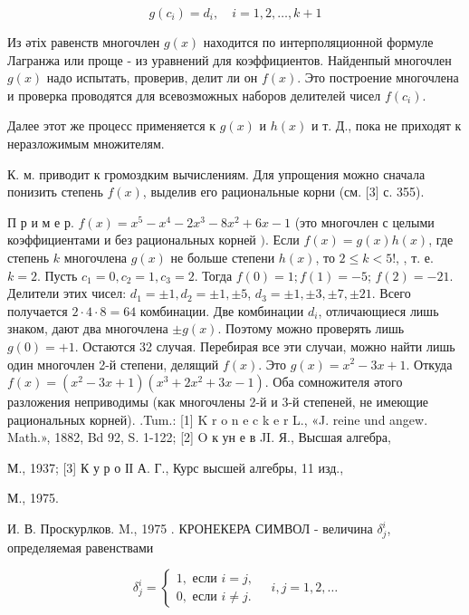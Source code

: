 \documentclass[10pt]{article}
\begin{document}
\[

g\left(c_{i}\right)=d_{i}, \quad i=1,2, \ldots, k+1

\]



Из әтіх равенств многочлен $g(x)$ находится по интерполяционной формуле Лагранжа или проще - из уравнений для коэффициентов. Найденпый многочлен $g(x)$ надо испытать, проверив, делит ли он $f(x)$. Это построение многочлена и проверка проводятся для всевозможных наборов делителей чисел $f\left(c_{i}\right)$.



Далее этот же процесс применяется к $g(x)$ и $h(x)$ и т. Д., пока не приходят к неразложимым множителям.



К. м. приводит к громоздким вычислениям. Для упрощения можно сначала понизить степень $f(x)$, выделив его рациональные корни (см. [3] с. 355).



П р и м е р. $f(x)=x^{5}-x^{4}-2 x^{3}-8 x^{2}+6 x-1$ (это многочлен с целыми коэффициентами и без рациональных корней $)$. Если $f(x)=g(x) h(x)$, где степень $k$ многочлена $g(x)$ не больше степени $h(x)$, то $2 \leqslant k<5 !$, , т. е. $k=2$. Пусть $c_{1}=0, c_{2}=1, c_{3}=2$. Тогда $f(0)=1 ; f(1)=-5$; $f(2)=-21$. Делители этих чисел: $d_{1}= \pm 1, d_{2}= \pm 1, \pm 5$, $d_{3}= \pm 1, \pm 3, \pm 7, \pm 21$. Всего получается $2 \cdot 4 \cdot 8=64$ комбинации. Две комбинации $d_{i}$, отличающиеся лишь знаком, дают два многочлена $\pm g(x)$. Поэтому можно проверять лишь $g(0)=+1$. Остаются 32 случая. Перебирая все эти случаи, можно найти лишь один многочлен 2-й степени, делящий $f(x)$. Это $g(x)=x^{2}-3 x+1$. Откуда $f(x)=\left(x^{2}-3 x+1\right)\left(x^{3}+2 x^{2}+3 x-1\right)$. Оба сомножителя әтого разложения неприводимы (как многочлены 2-й и 3-й степеней, не имеющие рациональных корней). .Tum.: [1] K r o n e c k e r L., «J. reine und angew. Math.», 1882, Bd 92, S. 1-122; [2] O к ун е в JI. Я., Высшая алгебра,



М., 1937; [3] К у р о ІІ А. Г., Курс высшей алгебры, 11 изд.,

М., 1975.

И. В. Проскурлков. M., 1975 . КРОНЕКЕРА СИМВОЛ - величина $\delta_{j}^{i}$, определяемая равенствами



\[

\delta_{j}^{i}=\left\{\begin{array}{l}

1, \text { если } i=j, \\

0, \text { если } i \neq j .

\end{array} \quad i, j=1,2, \ldots\right.

\]
\end{document}
